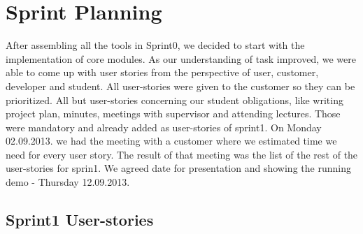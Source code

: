 \section{Sprint Planning}
After assembling all the tools in Sprint0, we decided to start with the implementation of core modules.
As our understanding of task improved, we were able to come up with user stories from the perspective of user, customer, developer and student.
All user-stories were given to the customer so they can be prioritized. 
All but user-stories concerning our student obligations, like writing project plan, minutes, meetings with supervisor and attending lectures.
Those were mandatory and already added as user-stories of sprint1.
On Monday 02.09.2013. we had the meeting with a customer where we estimated time we need for every user story.
The result of that meeting was the list of the rest of the user-stories for sprin1.
We agreed date for presentation and showing the running demo - Thursday 12.09.2013.

\subsection{Sprint1 User-stories}

